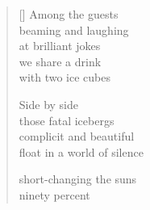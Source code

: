 \documentclass[11pt,a4paper]{article}
\begin{document}
\thispagestyle{empty}

\poemtitle{}

\settowidth{\versewidth}{float in a world of silence}

\bigskip

\begin{verse}[\versewidth]
  Among the guests \\
  beaming and laughing \\
  at brilliant jokes\\
  we share a drink\\
  with two ice cubes

  Side by side \\
  those fatal icebergs\\
  complicit and beautiful \\
  float in a world of silence

  short-changing the suns\\
  ninety percent
\end{verse}
\end{document}
